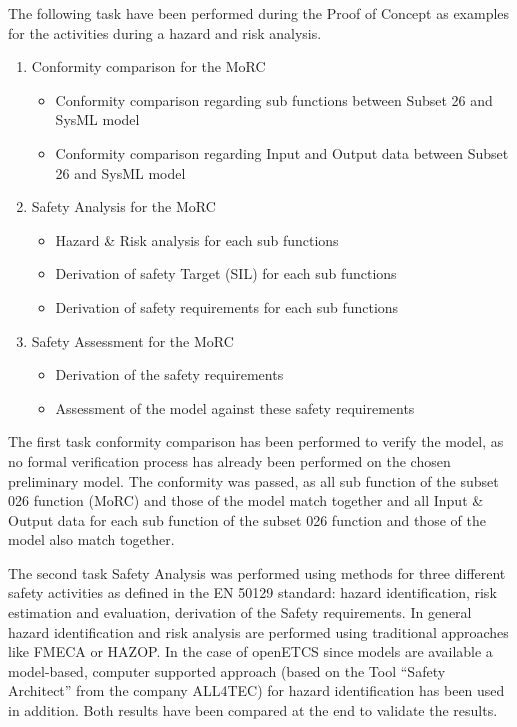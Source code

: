 \documentclass{template/openetcs_report}
\begin{document}
The following task have been performed during the Proof of Concept as examples for the activities during a hazard and risk analysis. 
 
 
\begin{enumerate}
\item Conformity comparison for the MoRC
	\begin{itemize}
	\item Conformity comparison regarding sub functions between Subset 26 and SysML model
	\item Conformity comparison regarding Input and Output data between Subset 26 and SysML model
	\end{itemize}
	
\item Safety Analysis for the MoRC
	\begin{itemize}
	\item Hazard \& Risk analysis for each sub functions
	\item Derivation of safety Target (SIL) for each sub functions
	\item Derivation of safety requirements for each sub functions
	\end{itemize}
	
\item Safety Assessment for the MoRC
	\begin{itemize}
	\item Derivation of the safety requirements
	\item Assessment of the model against these safety requirements
	\end{itemize}
\end{enumerate} 
 

The first task conformity comparison has been performed to verify the model, as no formal verification process has already been performed on the chosen preliminary model. The conformity was passed, as all sub function of the subset 026 function (MoRC) and those of the model match together and all Input \& Output data for each sub function of the subset 026 function and those of the model also match together. 

 
The second task Safety Analysis was performed using methods for three different safety activities as defined in the EN 50129 standard: hazard identification,
risk estimation and evaluation, derivation of the Safety requirements. In general hazard identification and risk analysis are performed using traditional approaches like FMECA or HAZOP. In the case of openETCS since models are available a model-based, computer supported approach (based on the Tool “Safety Architect” from the company ALL4TEC) for hazard identification has been used in addition.
Both results have been compared at the end to validate the results.
 
\end{document}
